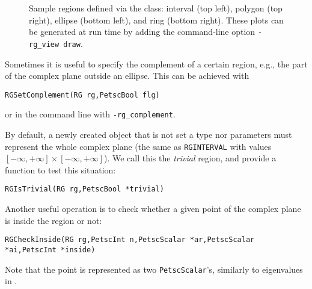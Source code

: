\begin{figure}[p]
\caption{\label{fig:rg}Sample regions defined via the  class: interval (top left), polygon (top right), ellipse (bottom left), and ring (bottom right). These plots can be generated at run time by adding the command-line option \texttt{-rg\_view draw}.}
\end{figure}

Sometimes it is useful to specify the complement of a certain region, e.g., the part of the complex plane outside an ellipse. This can be achieved with
        \begin{Verbatim}[fontsize=\small]
        RGSetComplement(RG rg,PetscBool flg)
        \end{Verbatim}
or in the command line with \Verb!-rg_complement!.

By default, a newly created  object that is not set a type nor parameters must represent the whole complex plane (the same as \texttt{RGINTERVAL} with values $[-\infty,+\infty]\times[-\infty,+\infty]$). We call this the \emph{trivial} region, and provide a function to test this situation:
        \begin{Verbatim}[fontsize=\small]
        RGIsTrivial(RG rg,PetscBool *trivial)
        \end{Verbatim}

Another useful operation is to check whether a given point of the complex plane is inside the region or not:
        \begin{Verbatim}[fontsize=\small]
        RGCheckInside(RG rg,PetscInt n,PetscScalar *ar,PetscScalar *ai,PetscInt *inside)
        \end{Verbatim}
Note that the point is represented as two \texttt{PetscScalar}'s, similarly to eigenvalues in \slepc.

